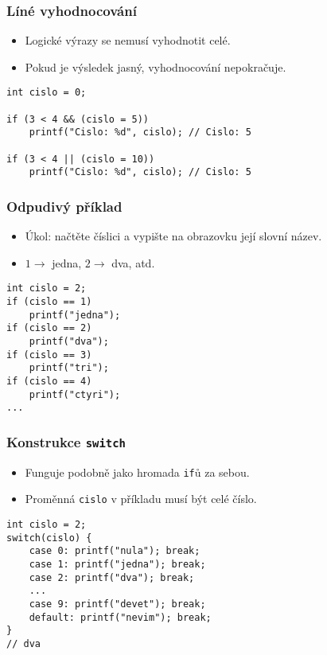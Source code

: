 \documentclass{beamer}
\newenvironment{itemizex}%
  {\large \begin{itemize}%
    \setlength{\itemsep}{8pt}%
    \setlength{\parskip}{8pt}}%
  {\end{itemize}}
\begin{document}
\begin{frame}[t,fragile]\frametitle{Líné vyhodnocování} 
  \begin{itemizex}
    \item Logické výrazy se nemusí vyhodnotit celé.
    \item Pokud je výsledek jasný, vyhodnocování nepokračuje.
  \end{itemizex}
  \begin{verbatim} 
int cislo = 0;

if (3 < 4 && (cislo = 5)) 
    printf("Cislo: %d", cislo); // Cislo: 5

if (3 < 4 || (cislo = 10))
    printf("Cislo: %d", cislo); // Cislo: 5

  \end{verbatim}
\end{frame}


\begin{frame}[t,fragile]\frametitle{Odpudivý příklad} 
  \begin{itemizex}
    \item Úkol: načtěte číslici a vypište na obrazovku její slovní název.
    \item $1\longrightarrow$ jedna, $2\longrightarrow$ dva, atd.
  \end{itemizex}

  \begin{verbatim} 
int cislo = 2;
if (cislo == 1)
    printf("jedna");
if (cislo == 2)
    printf("dva");
if (cislo == 3)
    printf("tri");
if (cislo == 4)
    printf("ctyri");
...
  \end{verbatim}
\end{frame}


\begin{frame}[t,fragile]\frametitle{Konstrukce \texttt{switch}} 
  \begin{itemizex}
    \item Funguje podobně jako hromada \texttt{if}ů za sebou.
    \item Proměnná \texttt{cislo} v příkladu musí být celé číslo.
  \end{itemizex}
  \begin{verbatim} 
int cislo = 2;
switch(cislo) {
    case 0: printf("nula"); break;
    case 1: printf("jedna"); break;
    case 2: printf("dva"); break;
    ...
    case 9: printf("devet"); break;
    default: printf("nevim"); break;
}
// dva
  \end{verbatim}
\end{frame}
\end{document}

